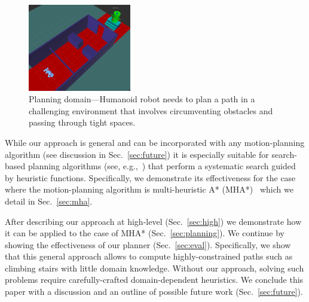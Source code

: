 \documentclass{article}
\begin{document}
\begin{figure}[tb]
  \centering
  	\includegraphics[width=0.4\textwidth]{fig/env.png}
  \caption{
  Planning domain---Humanoid robot needs to plan a path in a challenging environment that involves circumventing obstacles and passing through tight spaces.
}
   	\label{fig:robot}
\end{figure}



%

While our approach is general and can be incorporated with any motion-planning algorithm (see discussion in Sec.~\ref{sec:future}) it is especially suitable for search-based planning algorithms (see, e.g.,~\cite{CCL14}) that perform a systematic search guided by heuristic functions.
Specifically, we demonstrate its effectiveness for the case where the motion-planning algorithm is multi-heuristic A* (MHA*)~\cite{ASNHL16,NAL15} which we detail in Sec.~\ref{sec:mha}.




After describing our approach at high-level (Sec.~\ref{sec:high}) we demonstrate how it can be applied to the case of MHA* (Sec.~\ref{sec:planning}).
We continue by showing the effectiveness of our planner (Sec.~\ref{sec:eval}).
Specifically, we show that this general approach allows to compute highly-constrained paths such as climbing stairs with little domain knowledge.
Without our approach, solving such problems require carefully-crafted domain-dependent heuristics. 
We conclude this paper with a discussion and an outline of possible future work (Sec.~\ref{sec:future}).
\end{document}
